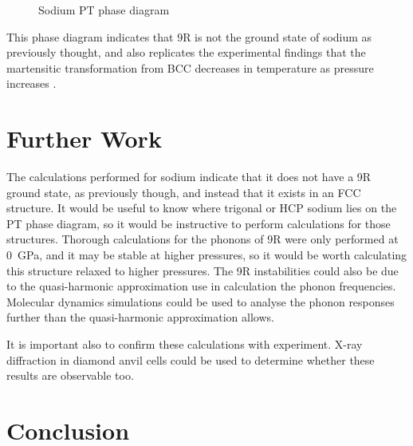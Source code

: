 \documentclass[12pt]{article}
\begin{document}
\begin{figure}
	\centering
	
	\caption{Sodium PT phase diagram}
	\label{fig:na_phase_diagram}
\end{figure}

This phase diagram indicates that 9R is not the ground state of sodium as previously thought, and also replicates the experimental findings that the martensitic transformation from BCC decreases in temperature as pressure increases \cite{smith1991pressure}.
\section{Further Work}
The calculations performed for sodium indicate that it does not have a 9R ground state, as previously though, and instead that it exists in an FCC structure. 
It would be useful to know where trigonal or HCP sodium lies on the PT phase diagram, so it would be instructive to perform calculations for those structures.
Thorough calculations for the phonons of 9R were only performed at \SI{0}{\giga\pascal}, and it may be stable at higher pressures, so it would be worth calculating this structure relaxed to higher pressures.
The 9R instabilities could also be due to the quasi-harmonic approximation use in calculation the phonon frequencies. Molecular dynamics simulations could be used to analyse the phonon responses further than the quasi-harmonic approximation allows.

It is important also to confirm these calculations with experiment. X-ray diffraction in diamond anvil cells could be used to determine whether these results are observable too.

\section{Conclusion}





\end{document}
